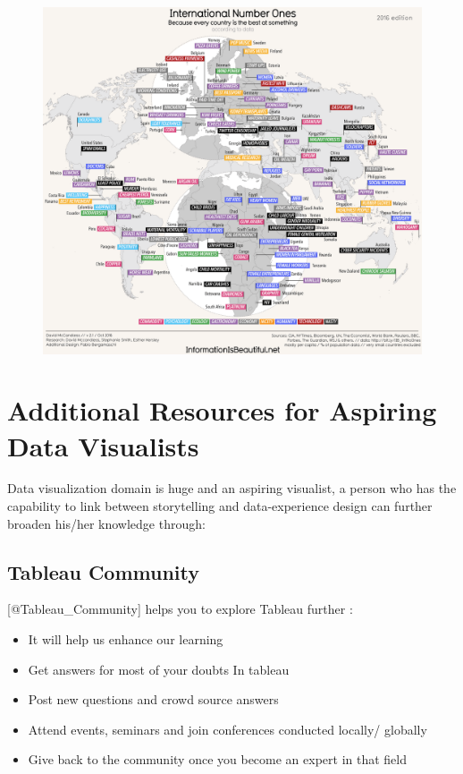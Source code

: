 \documentclass[]{book}
\providecommand{\tightlist}{%
  \setlength{\itemsep}{0pt}\setlength{\parskip}{0pt}}
\theoremstyle{definition}
\theoremstyle{definition}
\theoremstyle{definition}
\theoremstyle{remark}
\begin{document}
\begin{figure}
\centering
\includegraphics{images/Number_ones.png}
\caption{}
\end{figure}

\section{Additional Resources for Aspiring Data
Visualists}\label{additional-resources-for-aspiring-data-visualists}

Data visualization domain is huge and an aspiring visualist, a person
who has the capability to link between storytelling and data-experience
design can further broaden his/her knowledge through:

\subsection{Tableau Community}\label{tableau-community}

{[}@Tableau\_Community{]} helps you to explore Tableau further :

\begin{itemize}
\tightlist
\item
  It will help us enhance our learning
\item
  Get answers for most of your doubts In tableau
\item
  Post new questions and crowd source answers
\item
  Attend events, seminars and join conferences conducted locally/
  globally
\item
  Give back to the community once you become an expert in that field
\end{itemize}
\end{document}
